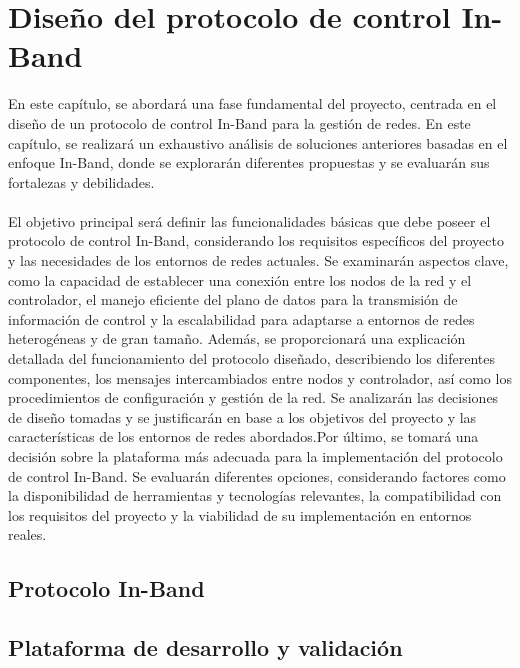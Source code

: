 \chapter{Diseño del protocolo de control In-Band}
\label{ch:analisis}

En este capítulo, se abordará una fase fundamental del proyecto, centrada en el diseño de un protocolo de control In-Band para la gestión de redes. En este capítulo, se realizará un exhaustivo análisis de soluciones anteriores basadas en el enfoque In-Band, donde se explorarán diferentes propuestas y se evaluarán sus fortalezas y debilidades.\\
\\
El objetivo principal será definir las funcionalidades básicas que debe poseer el protocolo de control In-Band, considerando los requisitos específicos del proyecto y las necesidades de los entornos de redes actuales. Se examinarán aspectos clave, como la capacidad de establecer una conexión entre los nodos de la red y el controlador, el manejo eficiente del plano de datos para la transmisión de información de control y la escalabilidad para adaptarse a entornos de redes heterogéneas y de gran tamaño. Además, se proporcionará una explicación detallada del funcionamiento del protocolo diseñado, describiendo los diferentes componentes, los mensajes intercambiados entre nodos y controlador, así como los procedimientos de configuración y gestión de la red. Se analizarán las decisiones de diseño tomadas y se justificarán en base a los objetivos del proyecto y las características de los entornos de redes abordados.Por último, se tomará una decisión sobre la plataforma más adecuada para la implementación del protocolo de control In-Band. Se evaluarán diferentes opciones, considerando factores como la disponibilidad de herramientas y tecnologías relevantes, la compatibilidad con los requisitos del proyecto y la viabilidad de su implementación en entornos reales.

\section{Protocolo In-Band}
\label{sec:ana_inband}

\section{Plataforma de desarrollo y validación}
\label{sec:ana_mininet_wifi}

